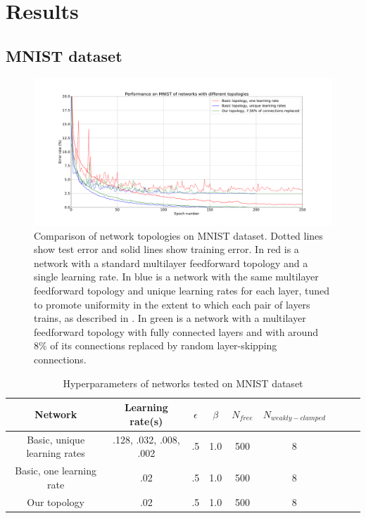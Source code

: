 \documentclass{article}
\begin{document}
\section{Results}
\subsection{MNIST dataset}

\begin{figure}
  \centering
  \includegraphics[width=\textwidth]{figures/MNIST_network_comparison.pdf}
  \caption{Comparison of network topologies on MNIST dataset. Dotted lines show test error and solid lines show training error. In red is a network with a standard multilayer feedforward topology and a single learning rate. In blue is a network with the same multilayer feedforward topology and unique learning rates for each layer, tuned to promote uniformity in the extent to which each pair of layers trains, as described in \cite{scellier17}. In green is a network with a multilayer feedforward topology with fully connected layers and with around $8\%$ of its connections replaced by random layer-skipping connections.}
  \label{fig:mnist_comparison}
\end{figure}

\begin{table}
\begin{center}
\begin{tabular}{|c|c|c|c|c|c|c|c|c|}
\hline
Network & Learning rate(s) & $\epsilon$ & $\beta$ & $N_{free}$ & $N_{weakly-clamped}$\\\hline\hline
Basic, unique learning rates & .128, .032, .008, .002 & .5 & 1.0 & 500 & 8 \\\hline
Basic, one learning rate & .02 & .5 & 1.0 & 500 & 8  \\\hline
Our topology & .02 & .5 & 1.0 & 500 & 8 \\\hline
\end{tabular}
\end{center}
\caption{Hyperparameters of networks tested on MNIST dataset}
\label{table:hyperparameters}
\end{table}
\end{document}
